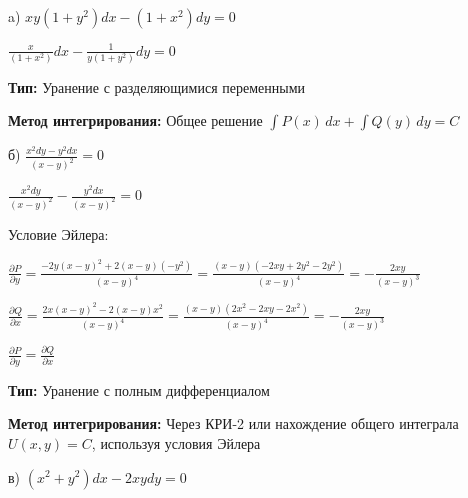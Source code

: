\documentclass[a4paper]{article}
\begin{document}
\vspace{0.3cm}

a) $\displaystyle xy(1+y^2)dx - (1+x^2)dy = 0$

\vspace{0.4cm}

$\displaystyle \frac{x}{(1+x^2)}dx - \frac{1}{y(1+y^2)}dy = 0$

\vspace{0.3cm}

\textbf{Тип: } Уранение с разделяющимися переменными

\textbf{Метод интегрирования: } Общее решение $\displaystyle \int\limits P(x)\,dx + \int\limits Q(y)\,dy = C$

\vspace{1cm}

б) $\displaystyle \frac{x^2dy-y^2dx}{(x-y)^2} = 0$

\vspace{0.4cm}

$\displaystyle \frac{x^2dy}{(x-y)^2}-\frac{y^2dx}{(x-y)^2} = 0$

\vspace{0.4cm}

Условие Эйлера: 

\vspace{0.3cm}

$\displaystyle \frac{\partial P}{\partial y}=\frac{-2y(x-y)^2+2(x-y)(-y^2)}{(x-y)^4}=\frac{(x-y)(-2xy+2y^2-2y^2)}{(x-y)^4}=-\frac{2xy}{(x-y)^3}$ 

\vspace{0.3cm}

$\displaystyle \frac{\partial Q}{\partial x}=\frac{2x(x-y)^2-2(x-y)x^2}{(x-y)^4}=\frac{(x-y)(2x^2-2xy-2x^2)}{(x-y)^4}=-\frac{2xy}{(x-y)^3}$ 

\vspace{0.3cm}

$\displaystyle \frac{\partial P}{\partial y}=\displaystyle \frac{\partial Q}{\partial x}$

\vspace{0.3cm}

\textbf{Тип: } Уранение с полным дифференциалом

\textbf{Метод интегрирования: } Через КРИ-2 или нахождение общего интеграла $U(x,y)=C$, используя условия Эйлера

\vspace{1cm}

в) $\displaystyle (x^2+y^2)dx - 2xydy = 0$

\vspace{0.3cm}
\end{document}
